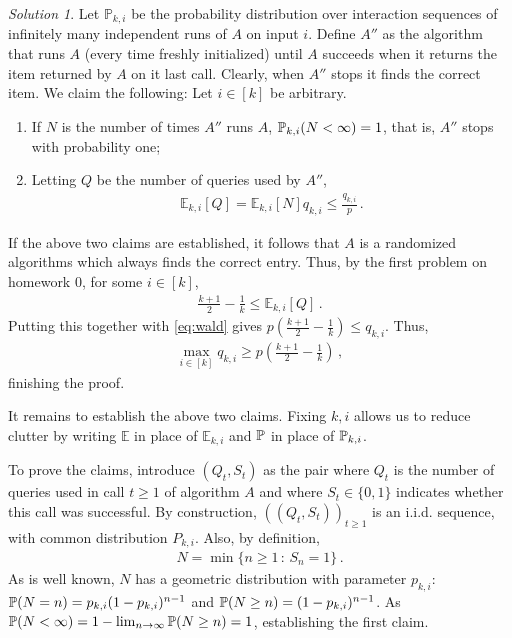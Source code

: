 \documentclass{article}
\DeclareMathOperator*{\1}{\mathbbm{1}}
\newcommand{\E}{\mathbb E}
\newcommand{\0}{\mathbf{0}}
\theoremstyle{definition}
\theoremstyle{remark}
\newtheorem*{solution*}{Solution}
\theoremstyle{theorem}
\begin{document}
\begin{solution*}
Let $\mathbb{P}_{k,i}$ be the probability distribution over interaction sequences of infinitely many independent runs of $A$ on input $i$.
Define $A''$ as the algorithm that runs $A$ (every time freshly initialized) until $A$ succeeds
when it returns the item returned by $A$ on it last call.
Clearly, when $A''$ stops it finds the correct item.
We claim the following: Let $i\in [k]$ be arbitrary.
\begin{enumerate}
\item If $N$ is the number of times $A''$ runs $A$, $\mathbb{P}_{k,i}(N<\infty)=1$, that is, $A''$ stops with probability one;
\item Letting $Q$ be the number of queries used by $A''$,
\begin{align}
\E_{k,i}[Q]=\E_{k,i}[N] q_{k,i} \le \frac{q_{k,i}}{p}\,.
\label{eq:wald}
\end{align}
\end{enumerate}
If the above two claims are established,
it follows that $A$  is a randomized algorithms which always finds the correct entry.
Thus, by the first problem on homework $0$, for some $i\in [k]$,
\begin{align*}
\frac{k+1}{2}-\frac{1}{k} \le \E_{k,i}[Q]\,.
\end{align*}
Putting this together with \eqref{eq:wald} gives
$p(\frac{k+1}{2}-\frac{1}{k}) \le q_{k,i}$.
Thus,
\begin{align*}
\max_{i\in [k]} q_{k,i} \ge p \left(\frac{k+1}{2}-\frac{1}{k} \right)\,,
\end{align*}
finishing the proof.

It remains to establish the above two claims.
Fixing $k,i$ allows us to reduce clutter by writing
$\E$ in place of $\E_{k,i}$ and $\mathbb{P}$ in place of $\mathbb{P}_{k,i}$.

To prove the claims,
introduce $(Q_t,S_t)$ as the pair where $Q_t$ is the number of queries used in call $t\ge 1$ of algorithm $A$ and where $S_t\in \{0,1\}$ indicates whether this call was successful.
By construction, $( (Q_t,S_t) )_{t\ge 1}$ is an i.i.d. sequence, with common distribution $P_{k,i}$.
Also, by definition,
\begin{align*}
N = \min \{ n\ge 1\,:\, S_n =1 \}\,.
\end{align*}
As is well known, $N$ has a geometric distribution with parameter $p_{k,i}$:
$\mathbb{P}(N=n)=p_{k,i}(1-p_{k,i})^{n-1}$ and $\mathbb{P}(N\ge n) = (1-p_{k,i})^{n-1}$.
As $\mathbb{P}(N<\infty)= 1-\lim_{n\to\infty} \mathbb{P}(N\ge n) =1$, establishing the first claim.


\end{solution*}
\end{document}
